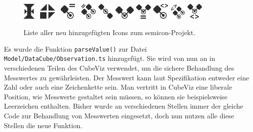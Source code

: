 \documentclass[11pt]{article}
\begin{document}
%
%
\begin{figure}[h!]
    \centering
    \includegraphics[width=0.6cm]{semicon/dataset3.pdf} \quad \ 
    \includegraphics[width=0.8cm]{semicon/dataStructureDefinition.pdf} \quad \ 
    \includegraphics[width=0.8cm]{semicon/equalDimensionElements.pdf} \quad \ 
    \includegraphics[width=0.8cm]{semicon/equalDimensionElements2.pdf} \quad
    \includegraphics[width=0.8cm]{semicon/equalDimensionElements3.pdf} \quad
    \includegraphics[width=1cm]{semicon/equalDimensionElements4.pdf} \quad
    \includegraphics[width=0.8cm]{semicon/equalDimensionElements5.pdf} \quad
    \includegraphics[width=0.8cm]{semicon/unequalDimensionElements.pdf} \quad
    \includegraphics[width=0.8cm]{semicon/unequalDimensionElements2.pdf} \quad
    \includegraphics[width=0.8cm]{semicon/unequalDimensionElements3.pdf} 
    \caption{Liste aller neu hinzugefügten Icons zum semicon-Projekt.}
    \label{fig:semicon_addedIcons}
\end{figure}

Es wurde die Funktion \verb|parseValue()| zur Datei \verb|Model/DataCube/Observation.ts| hinzugefügt. Sie wird von nun an in verschiedenen Teilen des CubeViz verwendet, um die sichere Behandlung des Messwertes zu gewährleisten. Der Messwert kann laut Spezifikation entweder eine Zahl oder auch eine Zeichenkette sein. Man vertritt in CubeViz eine liberale Position, wie Messwerte gestaltet sein müssen, so können sie beispielsweise Leerzeichen enthalten. Bisher wurde an verschiedenen Stellen immer der gleiche Code zur Behandlung von Messwerten eingesetzt, doch nun nutzen alle diese Stellen die neue Funktion.
\end{document}
